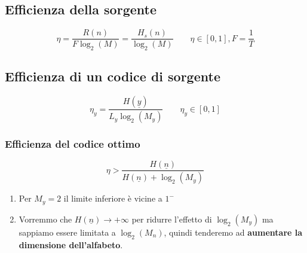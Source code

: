 \documentclass{article}
\begin{document}
\subsection{Efficienza della sorgente}
$$\eta=\frac{R(n)}{F\log_2(M)}=\frac{H_s(n)}{\log_2(M)}\qquad \eta\in[0,1],F=\frac{1}{T}$$

\subsection{Efficienza di un codice di sorgente}
$$\eta_y=\frac{H(\underline{y})}{L_y\log_2(M_y)}\qquad\eta_y\in[0,1]$$

\subsubsection{Efficienza del codice ottimo}
$$\eta>\frac{H(\underline{n})}{H(\underline{n})+\log_2(M_y)}$$
\begin{enumerate}
	\item Per $M_y=2$ il limite inferiore è vicine a $1^-$
	\item Vorremmo che $H(\underline{n})\rightarrow+\infty$ per ridurre l'effetto di $\log_2(M_y)$ ma sappiamo essere limitata a $\log_2(M_n)$, quindi tenderemo ad \textbf{aumentare la dimensione dell'alfabeto}.
\end{enumerate}
\end{document}
